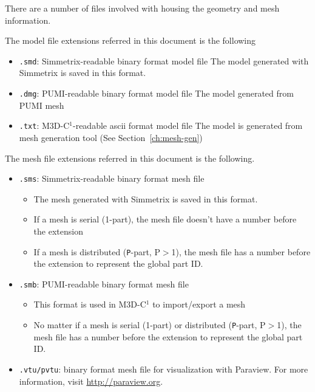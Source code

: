 There are a number of files involved with housing the geometry and mesh information. 

The model file extensions referred in this document is the following
\begin{itemize}
\item \texttt{.smd}: Simmetrix-readable binary format model file  
\newline  The model generated with Simmetrix is saved in this format.
\item \texttt{.dmg}: PUMI-readable binary format model file
\newline	The model generated from PUMI mesh
\item	\texttt{.txt}: M3D-C$^{1}$-readable ascii format model file 
\newline	The model is generated from mesh generation tool (See Section~\ref{ch:mesh-gen})
\end{itemize}

The mesh file extensions referred in this document is the following.
\begin{itemize}
\item	\texttt{.sms}: Simmetrix-readable binary format mesh file
\begin{itemize}
\item	The mesh generated with Simmetrix is saved in this format.
\item	If a mesh is serial (1-part), the mesh file doesn't have a number before the extension
\item	If a mesh is distributed (\texttt{P}-part, P$>$1), the mesh file has a number before the extension to represent the global part ID.
\end{itemize}
\item	\texttt{.smb}: PUMI-readable binary format mesh file
\begin{itemize}
\item	This format is used in M3D-C$^{1}$ to import/export a mesh
\item	No matter if a mesh is serial (1-part) or distributed (\texttt{P}-part, P$>$1), the mesh file has a number before the extension to represent the global part ID.
\end{itemize}
\item \texttt{.vtu/pvtu}: binary format mesh file for visualization with Paraview. For more information, visit \href{http://paraview.org}{http://paraview.org}.
\end{itemize}

